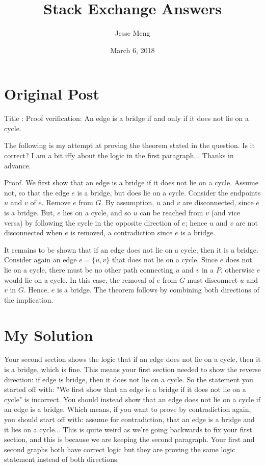 \documentclass{article}
\title{Stack Exchange Answers}
\author{Jesse Meng }
\date{March 6, 2018}
\begin{document}
\maketitle

\section{Original Post}
Title : Proof verification: An edge is a bridge if and only if it does not lie on a cycle.

The following is my attempt at proving the theorem stated in the question. Is it correct? I am a bit iffy about the logic in the first paragraph... Thanks in advance.

Proof.
We first show that an edge is a bridge if it does not lie on a cycle. Assume not, so that the edge $e$ is a bridge, but does lie on a cycle. Consider the endpoints $u$ and $v$ of $e$. Remove $e$ from $G$. By assumption, $u$ and $v$ are disconnected, since $e$ is a bridge. But, $e$ lies on a cycle, and so $u$ can be reached from $v$ (and vice versa) by following the cycle in the opposite direction of $e$; hence $u$ and $v$ are not disconnected when $e$ is removed, a contradiction since $e$ is a bridge.

It remains to be shown that if an edge does not lie on a cycle, then it is a bridge. Consider again an edge $e = \{u, v\}$ that does not lie on a cycle. Since $e$ does not lie on a cycle, there must be no other path connecting $u$ and $v$ in a $P$, otherwise $e$ would lie on a cycle. In this case, the removal of $e$ from $G$ must disconnect $u$ and $v$ in $G$. Hence, $e$ is a bridge. The theorem follows by combining both directions of the implication.
\section{My Solution}
Your second section shows the logic that if an edge does not lie on a cycle, then it is a bridge, which is fine. This means your first section needed to show the reverse direction: if edge is bridge, then it does not lie on a cycle. So the statement you started off with: "We first show that an edge is a bridge if it does not lie on a cycle" is incorrect. You should instead show that an edge does not lie on a cycle if  an edge is a bridge. Which means, if you want to prove by contradiction again, you should start off with: assume for contradiction, that an edge is a bridge and it lies on a cycle... This is quite weird as we're going backwards to fix your first section, and this is because we are keeping the second paragraph. Your first and second graphs both have correct logic but they are proving the same logic statement instead of both directions.
\end{document}
